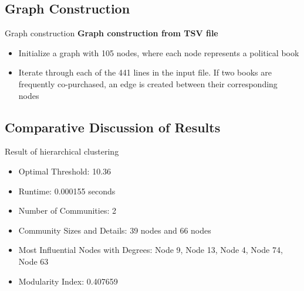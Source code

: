 \documentclass[compress]{beamer}
\begin{document}
\subsection{Graph Construction}

\begin{frame}[t]{Graph construction}
 \textbf{Graph construction from TSV file}
 \begin{itemize}
 
        \item Initialize a graph with 105 nodes, where each node represents a political book
        \item Iterate through each of the 441 lines in the input file. If two books are
 frequently co-purchased, an edge is created between their corresponding nodes
    \end{itemize}
\end{frame}
\subsection{Comparative Discussion of Results}
\begin{frame}[t]{Result of hierarchical clustering}
 \begin{itemize}
  \item Optimal Threshold: 10.36
 \item Runtime: 0.000155 seconds
 \item Number of Communities: 2
 \item Community Sizes and Details: 39 nodes and 66 nodes
   \item Most Influential Nodes with Degrees: Node 9, Node 13, Node 4, Node 74, Node 63
 \item Modularity Index: 0.407659
 \end{itemize}
\end{frame}
\end{document}
